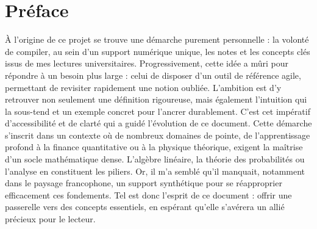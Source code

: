 \section{Préface}

\noindent À l'origine de ce projet se trouve une démarche purement personnelle : la volonté de compiler, au sein d'un support numérique unique, les notes et les concepts clés issus de mes lectures universitaires. Progressivement, cette idée a mûri pour répondre à un besoin plus large : celui de disposer d'un outil de référence agile, permettant de revisiter rapidement une notion oubliée. L'ambition est d'y retrouver non seulement une définition rigoureuse, mais également l'intuition qui la sous-tend et un exemple concret pour l'ancrer durablement. C'est cet impératif d'accessibilité et de clarté qui a guidé l'évolution de ce document. Cette démarche s'inscrit dans un contexte où de nombreux domaines de pointe, de l'apprentissage profond à la finance quantitative ou à la physique théorique, exigent la maîtrise d'un socle mathématique dense. L'algèbre linéaire, la théorie des probabilités ou l'analyse en constituent les piliers. Or, il m'a semblé qu'il manquait, notamment dans le paysage francophone, un support synthétique pour se réapproprier efficacement ces fondements. Tel est donc l'esprit de ce document : offrir une passerelle vers des concepts essentiels, en espérant qu'elle s'avérera un allié précieux pour le lecteur.

\newpage